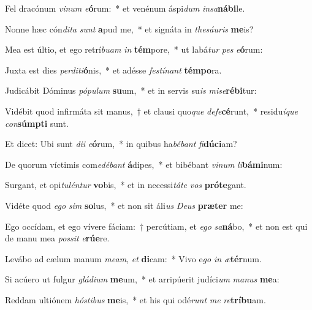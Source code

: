 \item Fel dracónum \textit{vi}\textit{num} \textit{e}\textbf{ó}rum:~* et venénum áspi\textit{dum} \textit{in}\textit{sa}\textbf{ná}\textbf{bi}le.
\item Nonne hæc cón\textit{di}\textit{ta} \textit{sunt} \textbf{a}pud me,~* et signáta in \textit{the}\textit{sáu}\textit{ris} \textbf{me}is?
\item Mea est últio, et ego retrí\textit{bu}\textit{am} \textit{in} \textbf{tém}pore,~* ut labá\textit{tur} \textit{pes} \textit{e}\textbf{ó}rum:
\item Juxta est dies \textit{per}\textit{di}\textit{ti}\textbf{ó}nis,~* et adésse \textit{fes}\textit{tí}\textit{nant} \textbf{tém}\textbf{po}ra.
\item Judicábit Dóminus \textit{pó}\textit{pu}\textit{lum} \textbf{su}um,~* et in servis su\textit{is} \textit{mi}\textit{se}\textbf{ré}\textbf{bi}tur:
\item Vidébit quod infirmáta sit manus,~† et clausi quo\textit{que} \textit{de}\textit{fe}\textbf{cé}runt,~* residu\textit{í}\textit{que} \textit{con}\textbf{súmp}\textbf{ti} sunt.
\item Et dicet: Ubi sunt \textit{di}\textit{i} \textit{e}\textbf{ó}rum,~* in quibus ha\textit{bé}\textit{bant} \textit{fi}\textbf{dú}\textbf{ci}am?
\item De quorum víctimis com\textit{e}\textit{dé}\textit{bant} \textbf{á}dipes,~* et bibébant \textit{vi}\textit{num} \textit{li}\textbf{bá}\textbf{mi}num:
\item Surgant, et opi\textit{tu}\textit{lén}\textit{tur} \textbf{vo}bis,~* et in necessi\textit{tá}\textit{te} \textit{vos} \textbf{pró}\textbf{te}gant.
\item Vidéte quod \textit{e}\textit{go} \textit{sim} \textbf{so}lus,~* et non sit áli\textit{us} \textit{De}\textit{us} \textbf{præ}\textbf{ter} me:
\item Ego occídam, et ego vívere fáciam:~† percútiam, et \textit{e}\textit{go} \textit{sa}\textbf{ná}bo,~* et non est qui de manu mea \textit{pos}\textit{sit} \textit{e}\textbf{rú}\textbf{e}re.
\item Levábo ad cælum manum \textit{me}\textit{am}, \textit{et} \textbf{di}cam:~* Vivo e\textit{go} \textit{in} \textit{æ}\textbf{tér}num.
\item Si acúero ut fulgur \textit{glá}\textit{di}\textit{um} \textbf{me}um,~* et arripúerit judíci\textit{um} \textit{ma}\textit{nus} \textbf{me}a:
\item Reddam ultiónem \textit{hós}\textit{ti}\textit{bus} \textbf{me}is,~* et his qui odé\textit{runt} \textit{me} \textit{re}\textbf{trí}\textbf{bu}am.

